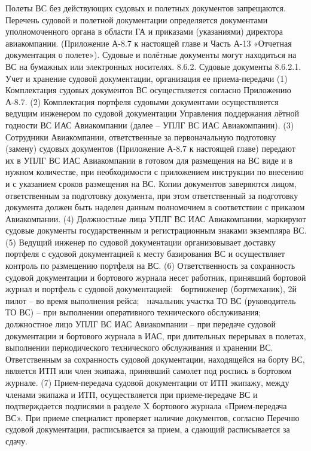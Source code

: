 Полеты ВС без действующих судовых и полетных документов запрещаются.
Перечень судовой и полетной документации определяется документами уполномоченного органа в области ГА и приказами (указаниями) директора авиакомпании. (Приложение А-8.7 к настоящей главе и Часть А-13 «Отчетная документация о полете»). 
Судовые и полётные документы могут находиться на ВС на бумажных или электронных носителях.
8.6.2. Судовые документы
8.6.2.1. Учет и хранение судовой документации, организация ее приема-передачи 
(1) Комплектация судовых документов ВС осуществляется согласно Приложению А-8.7.
(2) Комплектация портфеля судовыми документами осуществляется ведущим инженером по судовой документации Управления поддержания лётной годности ВС ИАС Авиакомпании (далее – УПЛГ ВС ИАС Авиакомпании). 
(3) Сотрудники Авиакомпании, ответственные за первоначальную подготовку (замену) судовых документов (Приложение А-8.7 к настоящей главе) передают их в УПЛГ ВС ИАС Авиакомпании в готовом для размещения на ВС виде и в нужном количестве, при необходимости с приложением инструкции по внесению и с указанием сроков размещения на ВС.
Копии документов заверяются лицом, ответственным за подготовку документа, при этом ответственный за подготовку документа должен быть наделен данным полномочием в соответствии с приказом Авиакомпании. 
(4) Должностные лица УПЛГ ВС ИАС Авиакомпании, маркируют судовые документы государственным и регистрационным знаками экземпляра ВС. 
(5) Ведущий инженер по судовой документации организовывает доставку портфеля с судовой документацией к месту базирования ВС и осуществляет контроль по размещению портфеля на ВС.
(6) Ответственность за сохранность судовой документации и бортового журнала несет работник, принявший бортовой журнал и портфель с судовой документацией:
	бортинженер (бортмеханик), 2й пилот – во время выполнения рейса;
	начальник участка ТО ВС (руководитель ТО ВС) – при выполнении оперативного технического обслуживания;
	должностное лицо УПЛГ ВС ИАС Авиакомпании – при передаче судовой документации и бортового журнала в ИАС, при длительных перерывах в полетах, выполнении периодического технического обслуживания и хранении ВС.
Ответственным за сохранность судовой документации, находящейся на борту ВС, является ИТП или член экипажа, принявший самолет под роспись в бортовом журнале. 
(7) Прием-передача судовой документации от ИТП экипажу, между членами экипажа и ИТП, осуществляется при приеме-передаче ВС и подтверждается подписями в разделе X бортового журнала «Прием-передача ВС».
При приеме специалист проверяет наличие документов, согласно Перечню судовой документации, расписывается за прием, а сдающий расписывается за сдачу. 
